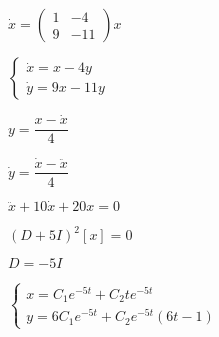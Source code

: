 \documentclass[a4paper, 14pt, titlepage, fleqn]{extarticle}
\begin{document}
	\( \dot{x} = \begin{pmatrix} 1 &  -4 \\9 & -11\end{pmatrix} x \)

	\(\begin{cases}
		\dot{x} = x - 4y \\
		\dot{y} = 9x - 11y
	\end{cases}\)

	\( y = \dfrac{x - \dot{x}}{4} \)

	\( \dot{y} = \dfrac{\dot{x} - \ddot{x}}{4} \)

	\( \ddot{x} + 10\dot{x} + 20x = 0 \)

	\( (D + 5I)^2[x] = 0\)

	\( D  = -5I \)
	
	\(\begin{cases}
		x = C_1e^{-5t} + C_2te^{-5t}\\
		y = 6C_1e^{-5t} + C_2e^{-5t}(6t-1)
	\end{cases}\)
\end{document}
